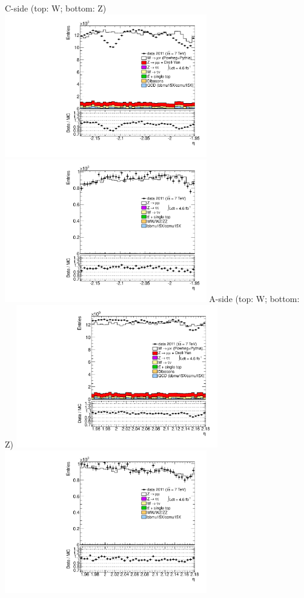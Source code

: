  {
\colb[T]
C-side (top: W; bottom: Z)
\centering
\includegraphics[width=0.66\textwidth]{dates/20130306/figures/etaphi/W_10_C_stack_l_eta_POS} \\
\includegraphics[width=0.66\textwidth]{dates/20130306/figures/etaphi/Z_10_C_stack_lP_eta_ALL.pdf}
A-side (top: W; bottom: Z)
\centering
\includegraphics[width=0.66\textwidth]{dates/20130306/figures/etaphi/W_10_A_stack_l_eta_POS} \\
\includegraphics[width=0.66\textwidth]{dates/20130306/figures/etaphi/Z_10_A_stack_lP_eta_ALL.pdf} 
\cole
}

